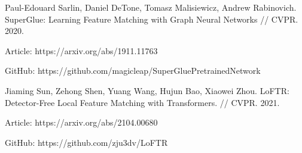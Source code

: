 \documentclass[a4paper]{article}
\begin{document}
\begin{thebibliography}{40}

 Paul-Edouard Sarlin, Daniel DeTone, Tomasz Malisiewicz, Andrew Rabinovich. SuperGlue: Learning Feature Matching with Graph Neural Networks // CVPR. 2020.

Article: https://arxiv.org/abs/1911.11763

GitHub: https://github.com/magicleap/SuperGluePretrainedNetwork


 Jiaming Sun, Zehong Shen, Yuang Wang, Hujun Bao, Xiaowei Zhou. LoFTR: Detector-Free Local Feature Matching with Transformers. // CVPR. 2021.

Article: https://arxiv.org/abs/2104.00680

GitHub: https://github.com/zju3dv/LoFTR


\end{thebibliography}
\end{document}
